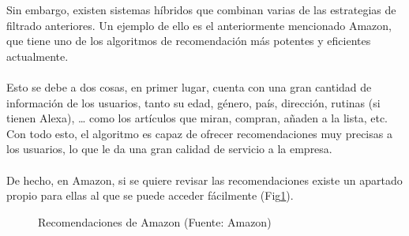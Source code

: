 Sin embargo, existen sistemas híbridos que combinan varias de las estrategias de filtrado anteriores. Un ejemplo de ello es el anteriormente mencionado Amazon, que tiene uno de los algoritmos de recomendación más potentes y eficientes actualmente. 
\\ \\
Esto se debe a dos cosas, en primer lugar, cuenta con una gran cantidad de información de los usuarios, tanto su edad, género, país, dirección, rutinas (si tienen Alexa), … como los artículos que miran, compran, añaden a la lista, etc. Con todo esto, el algoritmo es capaz de ofrecer recomendaciones muy precisas a los usuarios, lo que le da una gran calidad de servicio a la empresa.
\\ \\
De hecho, en Amazon, si se quiere revisar las recomendaciones existe un apartado propio para ellas al que se puede acceder fácilmente (Fig\ref{fig:AmazonRecomendaciones}).
\begin{figure}[thbp]
    \centering
    \caption{Recomendaciones de Amazon (Fuente: Amazon\autocite{AmazonEsCompra})} 
    \label{fig:AmazonRecomendaciones}
\end{figure}

